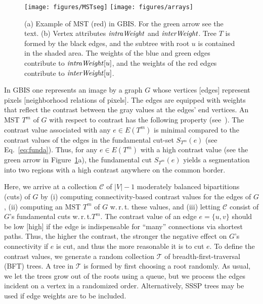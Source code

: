 \documentclass[pdftex]{llncs}
\DeclareMathOperator{\intraWeight}{\it intraWeight}
\DeclareMathOperator{\interWeight}{\it interWeight}
\newcommand{\wrt}{w.\,r.\,t.\xspace}
\numberwithin{equation}{section}
\numberwithin{example}{section}
\numberwithin{table}{section}
\begin{document}
\begin{figure}[tb]
\begin{centering}
\texttt{[image: figures/MSTseg]}
\hspace{12ex}
\texttt{[image: figures/arrays]}
\par\end{centering}
\caption{\label{fig:arrays} (a) Example of MST (red) in GBIS. For the
  green arrow see the text. (b) Vertex attributes $\intraWeight$ and
  $\interWeight$. Tree $T$ is formed by the black edges, and the
  subtree with root $u$ is contained in the shaded area. The weights
  of the blue and green edges contribute to $\intraWeight[u]$, and the
  weights of the red edges contribute to $\interWeight[u]$.}
\vspace{-0.5cm}
\end{figure}
In GBIS one represents an image by a graph $G$ whose vertices [edges]
represent pixels [neighborhood relations of pixels]. The edges are
equipped with weights that reflect the contrast between the gray
values at the edges' end vertices. An MST $T^m$ of $G$ with respect to
contrast has the following property
(see~\cite[Thm.~4.3.3]{Jungnickel05a}).  The contrast value associated
with any $e \in E(T^m)$ is minimal compared to the contrast values of
the edges in the fundamental cut-set $S_{T^m}(e)$ (see
Eq.~\ref{eq:funda}). Thus, for any $e \in E(T^m)$ with a high contrast
value (see the green arrow in Figure~\ref{fig:arrays}a), the
fundamental cut $S_{T^m}(e)$ yields a segmentation into two regions
with a high contrast anywhere on the common border.

Here, we arrive at a collection $\mathcal{C}$ of $\vert V \vert - 1$
moderately balanced bipartitions (cuts) of $G$ by (i) computing
connectivity-based contrast values for the edges of $G$, (ii)
computing an MST $T^m$ of $G$ \wrt these values, and (iii) letting
$\mathcal{C}$ consist of $G$'s fundamental cuts \wrt $T^m$. The
contrast value of an edge $e = \{u, v\}$ should be low [high] if the
edge is indispensable for ``many'' connections via shortest
paths. Thus, the higher the contrast, the stronger the negative effect
on $G$'s connectivity if $e$ is cut, and thus the more reasonable it
is to cut $e$.
To define the contrast values, we generate a random collection
$\mathcal{T}$ of breadth-first-traversal (BFT) trees. A tree in
$\mathcal{T}$ is formed by first choosing a root randomly. As usual,
we let the trees grow out of the roots using a queue, but we process
the edges incident on a vertex in a randomized order. Alternatively,
SSSP trees may be used if edge weights are to be included.
\end{document}
